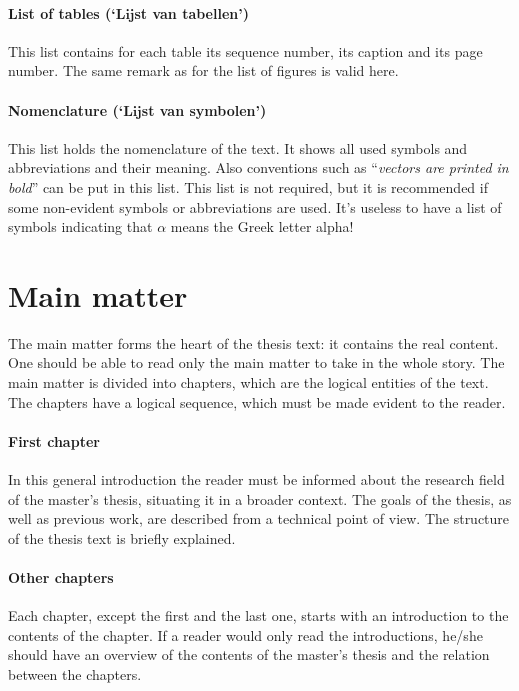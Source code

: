 \documentclass[11pt,article,oneside,a4paper]{memoir}
\newcommand\Dutch[1]{`\foreignlanguage{dutch}{#1}'}
\begin{document}
\paragraph{List of tables (\Dutch{Lijst van tabellen})} This list contains for each
table its sequence number, its caption and its page number. The same remark
as for the list of figures is valid here.

\paragraph{Nomenclature (\Dutch{Lijst van symbolen})} This list holds the
nomenclature of the text. It shows all used symbols and abbreviations and
their meaning. Also conventions such as ``\emph{vectors are printed in
  bold}'' can be put in this list. This list is not required, but it is
recommended if some non-evident symbols or abbreviations are used. It's
useless to have a list of symbols indicating that $\alpha$ means the Greek
letter alpha!

\section{Main matter}
The main matter forms the heart of the thesis text: it contains the real
content. One should be able to read only the main matter to take in the
whole story. The main matter is divided into chapters, which are the
logical entities of the text. The chapters have a logical sequence, which
must be made evident to the reader.

\paragraph{First chapter} In this general introduction the reader must be
informed about the research field of the master's thesis, situating it in a
broader context. The goals of the thesis, as well as previous work, are
described from a technical point of view. The structure of the thesis text
is briefly explained.

\paragraph{Other chapters} Each chapter, except the first and the last one,
starts with an introduction to the contents of the chapter. If a reader
would only read the introductions, he/she should have an overview of the
contents of the master's thesis and the relation between the chapters.
\end{document}
